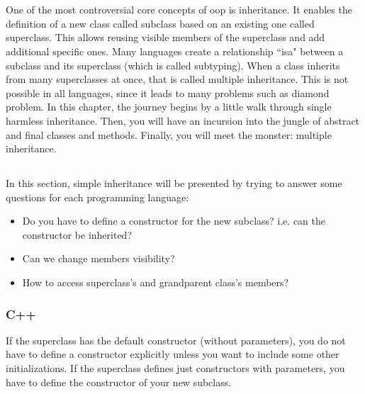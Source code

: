 \documentclass{KodeBook}
\begin{document}
		\mainmatter
	
\fi

\chapter{}

\begin{introduction}
	One of the most controversial core concepts of \ac{oop} is inheritance.
	It enables the definition of a new class called subclass based on an existing one called superclass. 
	This allows reusing visible members of the superclass and add additional specific ones. 
	Many languages create a relationship ``isa" between a subclass and its superclass (which is called subtyping).
	When a class inherits from many superclasses at once, that is called multiple inheritance. 
	This is not possible in all languages, since it leads to many problems such as diamond problem.
	In this chapter, the journey begins by a little walk through single harmless inheritance. 
	Then, you will have an incursion into the jungle of abstract and final classes and methods. 
	Finally, you will meet the monster: multiple inheritance. 
\end{introduction} 


\section{}

In this section, simple inheritance will be presented by trying to answer some questions for each programming language:
\begin{itemize}
	\item Do you have to define a constructor for the new subclass? i.e. can the constructor be inherited?
	\item Can we change members visibility?
	\item How to access superclass's and grandparent class's members?
\end{itemize}

\subsection{C++}

If the superclass has the default constructor (without parameters), you do not have to define a constructor explicitly unless you want to include some other initializations. 
If the superclass defines just constructors with parameters, you have to define the constructor of your new subclass. 
\end{document}

